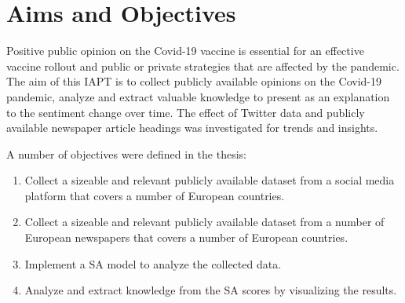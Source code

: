 %
%

\section{Aims and Objectives}

Positive public opinion on the Covid-19 vaccine is essential for an effective vaccine rollout and public or private strategies that are affected by the pandemic.
The aim of this \ac{IAPT} is to collect publicly available opinions on the Covid-19 pandemic, analyze and extract valuable knowledge to present as an explanation to the sentiment change over time.
The effect of Twitter data and publicly available newspaper article headings was investigated for trends and insights.

\noindent A number of objectives were defined in the thesis:

\begin{enumerate}
  \item Collect a sizeable and relevant publicly available dataset from a social media platform that covers a number of European countries.
  \item Collect a sizeable and relevant publicly available dataset from a number of European newspapers that covers a number of European countries.
  \item Implement a \ac{SA} model to analyze the collected data.
  \item Analyze and extract knowledge from the \ac{SA} scores by visualizing the results.
\end{enumerate}

